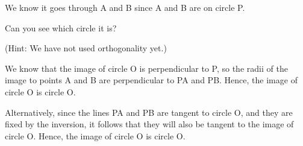 










We know it goes through A and B since A and B are on circle P.

Can you see which circle it is?

(Hint: We have not used orthogonality yet.)





We know that the image of circle O is perpendicular to P, so the radii of the image to points A and B are perpendicular to PA and PB.  Hence, the image of circle O is circle O.

Alternatively,  since the lines PA and PB are tangent to circle O, and they are fixed by the inversion, it follows that they will also be tangent to the image of circle O. Hence, the image of circle O is circle O.

